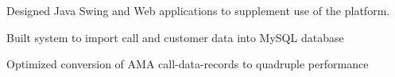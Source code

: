 \documentclass[letterpaper]{deedy-resume} %
\begin{document}
\begin{minipage}[t]{0.66\textwidth}
\sectionspace %
\sectionspace %


\vspace{\topsep} %
\begin{tightitemize}
\item Designed Java Swing and Web applications to supplement use of the platform.
\item Built system to import call and customer data into MySQL database
\item Optimized conversion of AMA call-data-records to quadruple performance
\end{tightitemize}

\sectionspace %



\end{minipage} %








\end{document}
